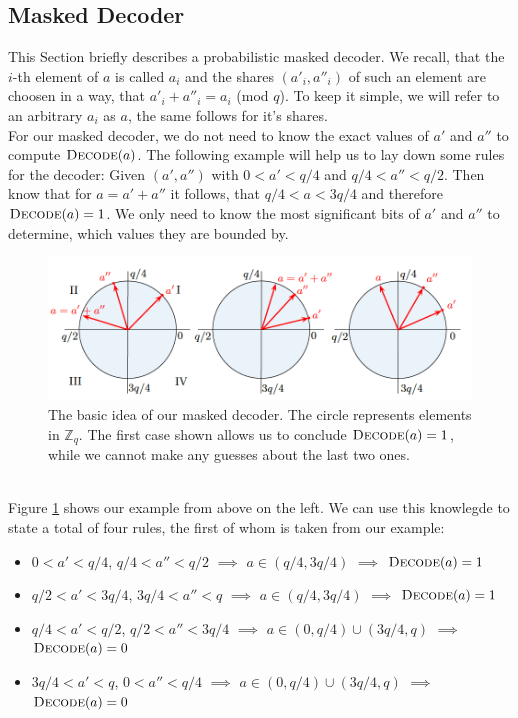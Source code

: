 \subsection{Masked Decoder}
This Section briefly describes a probabilistic masked decoder. We recall, that the \(i\)-th element of \(\textit{a}\) is called \(a_i\) and the shares \((a'_i,a''_i)\) of such an element are choosen in a way, that \(a'_i + a''_i = a_i\) (mod \(q\)). To keep it simple, we will refer to an arbitrary \(a_i\) as \(a\), the same follows for it's shares.\\
For our masked decoder, we do not need to know the exact values of \(a'\) and \(a''\) to compute \(\textsc{Decode}(a)\). The following example will help us to lay down some rules for the decoder: Given \((a', a'')\) with \(0 < a' < q/4\) and \(q/4 < a'' < q/2\). Then know that for \(a=a'+a''\) it follows, that \(q/4 < a < 3q/4\) and therefore \(\textsc{Decode}(a)=1\). We only need to know the most significant bits of \(a'\) and \(a''\) to determine, which values they are bounded by.
\begin{figure}
	\centering
	\includegraphics[width=\textwidth]{maskedDecoder_1.png}
	\caption{The basic idea of our masked decoder. The circle represents elements in \(\mathbb{Z}_q\). The first case shown allows us to conclude \(\textsc{Decode}(a)=1\), while we cannot make any guesses about the last two ones. \cite{maskedRing}}
	\label{maskedDecoder_1}
\end{figure}
\\Figure \ref{maskedDecoder_1} shows our example from above on the left. We can use this knowlegde to state a total of four rules, the first of whom is taken from our example:
\begin{itemize}
\item \(0 < a' < q/4\), \(q/4 < a'' < q/2\) \(\implies\) \(a \in (q/4,3q/4)\) \(\implies\) \(\textsc{Decode}(a)=1\)
\item \(q/2 < a' < 3q/4\), \(3q/4 < a'' < q\) \(\implies\) \(a \in (q/4,3q/4)\) \(\implies\) \(\textsc{Decode}(a)=1\)
\item \(q/4 < a' < q/2\), \(q/2 < a'' < 3q/4\) \(\implies\) \(a \in (0,q/4) \cup (3q/4,q)\) \(\implies\) \(\textsc{Decode}(a)=0\)
\item \(3q/4 < a' < q\), \(0 < a'' < q/4\) \(\implies\) \(a \in (0,q/4) \cup (3q/4,q)\) \(\implies\) \(\textsc{Decode}(a)=0\)
\end{itemize}
